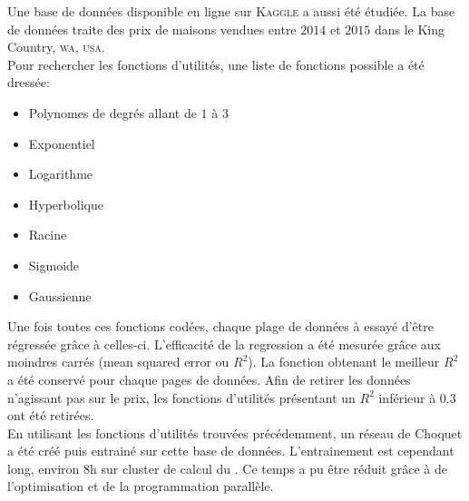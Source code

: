 Une base de données disponible en ligne sur \textsc{Kaggle} a aussi été étudiée\cite{kaggle}.
La base de données traite des prix de maisons vendues entre $2014$ et $2015$
dans le King Country, \textsc{wa}, \textsc{usa}.\\


Pour rechercher les fonctions d'utilités, une liste de fonctions possible a été dressée:
\begin{itemize}
    \item Polynomes de degrés allant de $1$ à $3$
    \item Exponentiel
    \item Logarithme
    \item Hyperbolique
    \item Racine
    \item Sigmoide
    \item Gaussienne
\end{itemize}
Une fois toutes ces fonctions codées, chaque plage de données à essayé d'être régressée grâce à celles-ci.
L'efficacité de la regression a été mesurée grâce aux moindres carrés (mean squared error ou $R^2$).
La fonction obtenant le meilleur $R^2$ a été conservé pour chaque pages de données.
Afin de retirer les données n'agissant pas sur le prix,
les fonctions d'utilités présentant un $R^2$ inférieur à $0.3$ ont été retirées.\\


En utilisant les fonctions d'utilités trouvées précédemment, un réseau de Choquet a été créé puis entrainé
sur cette base de données.
L'entrainement est cependant long, environ $8$h sur cluster de calcul du \lri.
Ce temps a pu être réduit grâce à de l'optimisation et de la programmation parallèle.
